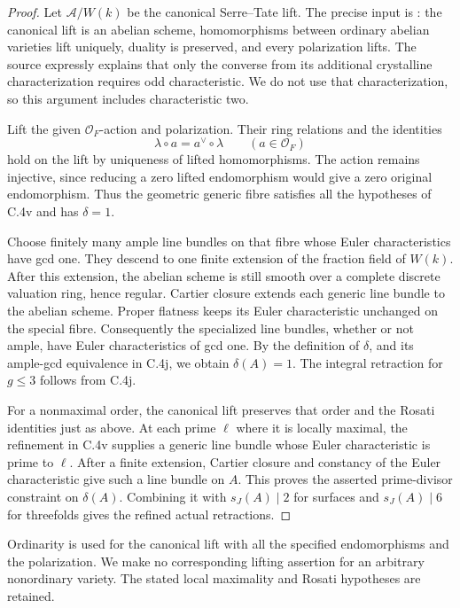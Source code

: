 \begin{proof}
Let \(\mathcal A/W(k)\) be the canonical Serre--Tate lift.
The precise input is
\citet[Theorem 1.4 and the following paragraph,
p.~115]{frC4DworkOgus1986RM}: the canonical lift is an
abelian scheme, homomorphisms between ordinary abelian
varieties lift uniquely, duality is preserved, and every
polarization lifts. The source expressly explains that
only the converse from its additional crystalline
characterization requires odd characteristic. We do not
use that characterization, so this argument includes
characteristic two.

Lift the given \(\mathcal O_F\)-action and polarization.
Their ring relations and the identities
\[
                 \lambda\circ a=a^\vee\circ\lambda
                      \qquad(a\in\mathcal O_F)
\]
hold on the lift by uniqueness of lifted homomorphisms.
The action remains injective, since reducing a zero
lifted endomorphism would give a zero original
endomorphism. Thus the geometric generic fibre satisfies
all the hypotheses of C.4v and has \(\delta=1\).

Choose finitely many ample line bundles on that fibre
whose Euler characteristics have gcd one. They descend
to one finite extension of the fraction field of \(W(k)\).
After this extension, the abelian scheme is still smooth
over a complete discrete valuation ring, hence regular.
Cartier closure extends each generic line bundle to the
abelian scheme. Proper flatness keeps its Euler
characteristic unchanged on the special fibre.
Consequently the specialized line bundles, whether or
not ample, have Euler characteristics of gcd one.
By the definition of \(\delta\), and its ample-gcd
equivalence in C.4j, we obtain \(\delta(A)=1\).
The integral retraction for \(g\le3\) follows from C.4j.

For a nonmaximal order, the canonical lift preserves
that order and the Rosati identities just as above.
At each prime \(\ell\) where it is locally maximal,
the refinement in C.4v supplies a generic line bundle
whose Euler characteristic is prime to \(\ell\).
After a finite extension, Cartier closure and
constancy of the Euler characteristic give such a
line bundle on \(A\). This proves the asserted
prime-divisor constraint on \(\delta(A)\).
Combining it with \(s_J(A)\mid2\) for surfaces and
\(s_J(A)\mid6\) for threefolds gives the refined
actual retractions.
\end{proof}

Ordinarity is used for the canonical lift with all the
specified endomorphisms and the polarization. We make
no corresponding lifting assertion for an arbitrary
nonordinary variety. The stated local maximality
and Rosati hypotheses are retained.
